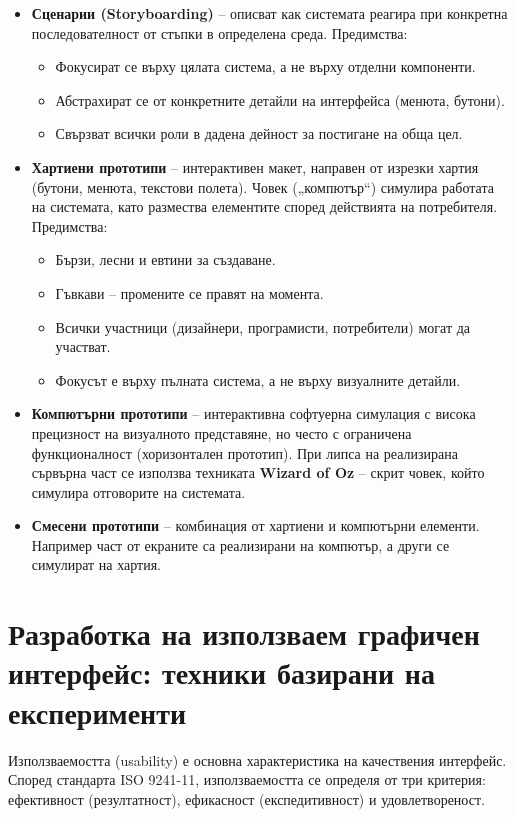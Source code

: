 \documentclass{scrartcl}
\begin{document}
\begin{FlushLeft}
\begin{itemize}
    \item \textbf{Сценарии (Storyboarding)} – описват как системата реагира при конкретна последователност от стъпки в определена среда. Предимства:
    \begin{itemize}
        \item Фокусират се върху цялата система, а не върху отделни компоненти.
        \item Абстрахират се от конкретните детайли на интерфейса (менюта, бутони).
        \item Свързват всички роли в дадена дейност за постигане на обща цел.
    \end{itemize}
    \item \textbf{Хартиени прототипи} – интерактивен макет, направен от изрезки хартия (бутони, менюта, текстови полета). Човек („компютър“) симулира работата на системата, като размества елементите според действията на потребителя. Предимства:
    \begin{itemize}
        \item Бързи, лесни и евтини за създаване.
        \item Гъвкави – промените се правят на момента.
        \item Всички участници (дизайнери, програмисти, потребители) могат да участват.
        \item Фокусът е върху пълната система, а не върху визуалните детайли.
    \end{itemize}
    \item \textbf{Компютърни прототипи} – интерактивна софтуерна симулация с висока прецизност на визуалното представяне, но често с ограничена функционалност (хоризонтален прототип). При липса на реализирана сървърна част се използва техниката \textbf{Wizard of Oz} – скрит човек, който симулира отговорите на системата.
    \item \textbf{Смесени прототипи} – комбинация от хартиени и компютърни елементи. Например част от екраните са реализирани на компютър, а други се симулират на хартия.
\end{itemize}

\section{Разработка на използваем графичен интерфейс: техники базирани на експерименти}

Използваемостта (usability) е основна характеристика на качествения интерфейс. Според стандарта ISO 9241-11, използваемостта се определя от три критерия: ефективност (резултатност), ефикасност (експедитивност) и удовлетвореност.


\end{FlushLeft}
\end{document}
